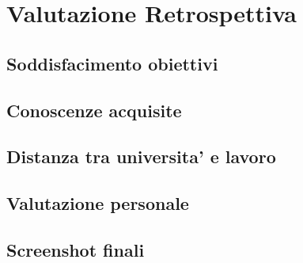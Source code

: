 \section{Valutazione Retrospettiva}
\subsection{Soddisfacimento obiettivi}
\subsection{Conoscenze acquisite}
\subsection{Distanza tra universita' e lavoro}
\subsection{Valutazione personale}
\subsection{Screenshot finali}